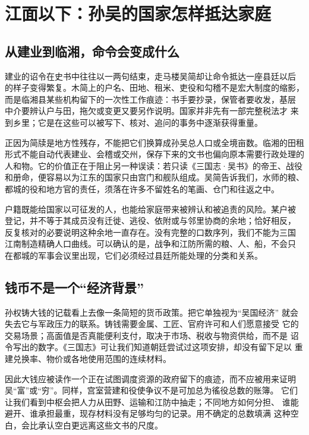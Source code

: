 \section{江面以下：孙吴的国家怎样抵达家庭}

\subsection{从建业到临湘，命令会变成什么}

建业的诏令在史书中往往以一两句结束，走马楼吴简却让命令抵达一座县廷以后
的样子变得繁复。木简上的户名、田地、租米、吏役和勾稽不是宏大制度的缩影，
而是临湘县某些机构留下的一次性工作痕迹：书手要抄录，保管者要收发，基层
中介要辨认户与田，拖欠或变更又要另作说明。国家并非先有一部完整税法才
来到乡里；它是在这些可以被写下、核对、追问的事务中逐渐获得重量。

正因为简牍是地方性残存，不能把它们换算成孙吴总人口或全境亩数。临湘的田租
形式不能自动代表建业、会稽或交州，保存下来的文书也偏向原本需要行政处理的
人和物。它的价值正在于阻止另一种误读：若只读《三国志·吴书》的帝王、战役
和册命，便容易以为江东的国家只由宫门和舰队组成。吴简告诉我们，水师的粮、
都城的役和地方官的责任，须落在许多不留姓名的笔画、仓门和往返之中。

户籍既能给国家以可征发的人，也能给家庭带来被辨认和被追责的风险。某户被
登记，并不等于其成员没有迁徙、逃役、依附或与邻里协商的余地；恰好相反，
反复核对的必要说明这种余地一直存在。没有完整的口数序列，我们不能为三国
江南制造精确人口曲线。可以确认的是，战争和江防所需的粮、人、船，不会只
在都城的军事会议里出现，它们必须经过县廷所能处理的分类和关系。

\subsection{钱币不是一个“经济背景”}

孙权铸大钱的记载看上去像一条简短的货币政策。把它单独视为“吴国经济”
就会失去它与军政压力的联系。铸钱需要金属、工匠、官府许可和人们愿意接受
它的交易场景；高面值是否真能便利支付，取决于市场、税收与物资供给，而不是
诏令写出的数字。《三国志》可让我们知道朝廷尝试过这项安排，却没有留下足以
重建兑换率、物价或各地使用范围的连续材料。

因此大钱应被读作一个正在试图调度资源的政府留下的痕迹，而不应被用来证明
吴“富”或“穷”。同样，宫室营建和役使争议不是可加总为徭役总数的账簿。
它们让我们看到中枢会把人力从田野、运输和江防中抽走；不同地方如何分担、
谁能避开、谁承担最重，现存材料没有足够均匀的记录。用不确定的总数填满
这种空白，会比承认空白更远离这些文书的尺度。

